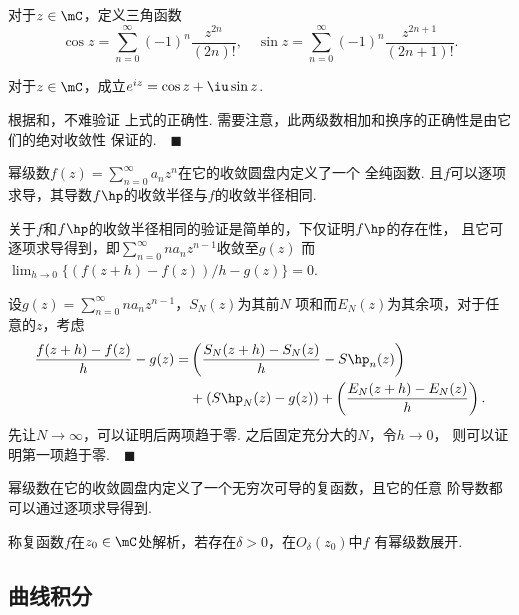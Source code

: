   \begin{defi}[三角函数]
    \label{defi: 三角函数}
    对于$z\in\mC$，定义三角函数
    \[
      \cos z = \sum_{n=0}^\infty(-1)^n\frac{z^{2n}}{(2n)!},\quad
      \sin z = \sum_{n=0}^\infty(-1)^n\frac{z^{2n+1}}{(2n+1)!}.
    \]
  \end{defi}

  \begin{thm}[Euler公式]
    \label{thm: Euler公式}
    对于$z\in\mC$，成立$e^{iz} = \cos z + \iu\sin z$.
  \end{thm}
  \proof
    根据和，不难验证
    上式的正确性. 需要注意，此两级数相加和换序的正确性是由它们的绝对收敛性
    保证的.$\quad\blacksquare$

  \begin{thm}
    幂级数$f(z)=\sum_{n=0}^\infty a_nz^n$在它的收敛圆盘内定义了一个
    全纯函数. 且$f$可以逐项求导，其导数$f\hp$的收敛半径与$f$的收敛半径相同.
  \end{thm}
  \proof
    关于$f$和$f\hp$的收敛半径相同的验证是简单的，下仅证明$f\hp$的存在性，
    且它可逐项求导得到，即$\sum_{n=0}^\infty na_nz^{n-1}$收敛至$g(z)$
    而$\lim_{h\to 0}\{(f(z+h)-f(z))/h - g(z)\} = 0$.\par
    设$g(z)=\sum_{n=0}^\infty na_nz^{n-1}$，$S_N(z)$为其前$N$
    项和而$E_N(z)$为其余项，对于任意的$z$，考虑
    \[\begin{split}
      \frac{f(z+h)-f(z)}{h} - g(z) = &
      \left( \frac{S_N(z+h)-S_N(z)}{h} - S\hp_n(z) \right)\\
      &+ (S\hp_N(z) - g(z)) + \left( \frac{E_N(z+h)-E_N(z)}{h} \right).
    \end{split}\]
    先让$N\to\infty$，可以证明后两项趋于零. 之后固定充分大的$N$，令$h\to 0$，
    则可以证明第一项趋于零.$\quad\blacksquare$

  \begin{cor}
    幂级数在它的收敛圆盘内定义了一个无穷次可导的复函数，且它的任意
    阶导数都可以通过逐项求导得到.
  \end{cor}

  \begin{defi}[解析]
    称复函数$f$在$z_0\in\mC$处解析，若存在$\delta>0$，在$O_\delta(z_0)$中$f$
    有幂级数展开.
  \end{defi}

\subsection{曲线积分}

